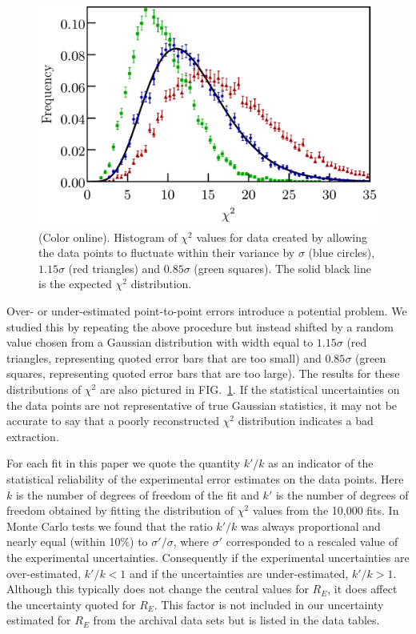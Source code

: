 \documentclass[aps,prd,twocolumn,groupedaddress,10pt]{revtex4-1}
\begin{document}
\begin{figure}[h!]
	\includegraphics[scale=0.41]{chi2_distros.pdf}
	\caption{(Color online). Histogram of $\chi^2$ values for data created by allowing the data points to fluctuate within their variance by $\sigma$ (blue circles), $1.15 \sigma$ (red triangles) and $0.85 \sigma$ (green squares). The solid black line is the expected $\chi^2$ distribution.}
	\label{chi2_distros}
\end{figure}

Over- or under-estimated point-to-point errors introduce a potential problem. We studied this by repeating the above procedure but instead shifted by a random value chosen from a Gaussian distribution with width equal to $1.15 \sigma$ (red triangles, representing quoted error bars that are too small) and $0.85 \sigma$ (green squares, representing quoted error bars that are too large). The results for these distributions of $\chi^2$ are also pictured in FIG.~\ref{chi2_distros}. If the statistical uncertainties on the data points are not representative of true Gaussian statistics, it may not be accurate to say that a poorly reconstructed $\chi^2$ distribution indicates a bad extraction.

For each fit in this paper we quote the quantity $k'/k$ as an indicator of the statistical reliability of the experimental error estimates on the data points. Here $k$ is the number of degrees of freedom of the fit and $k'$ is the number of degrees of freedom obtained by fitting the distribution of $\chi^2$ values from the 10,000 fits. In Monte Carlo tests we found that the ratio $k'/k$ was always proportional and nearly equal (within 10\%) to $\sigma'/\sigma$, where $\sigma'$ corresponded to a rescaled value of the experimental uncertainties. Consequently if the experimental uncertainties are over-estimated, $k'/k<1$ and if the uncertainties are under-estimated, $k'/k>1$. Although this typically does not change the central values for $R_E$, it does affect the uncertainty quoted for $R_E$. This factor is not included in our uncertainty estimated for $R_E$ from the archival data sets but is listed in the data tables.
\end{document}
